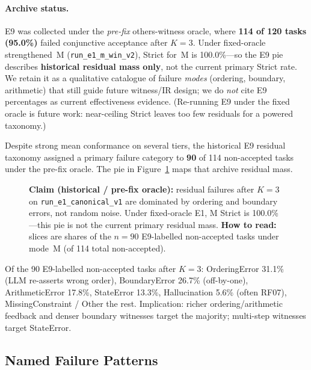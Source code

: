 \paragraph{Archive status.}
E9 was collected under the \emph{pre-fix} others-witness oracle, where
\textbf{114 of 120 tasks (95.0\%)} failed conjunctive acceptance after
$K{=}3$.
Under fixed-oracle strengthened~M (\texttt{run\_e1\_m\_win\_v2}), Strict for~M
is 100.0\%---so the E9 pie describes \textbf{historical residual mass only},
not the current primary Strict rate.
We retain it as a qualitative catalogue of failure \emph{modes} (ordering,
boundary, arithmetic) that still guide future witness/IR design; we do
\emph{not} cite E9 percentages as current effectiveness evidence.
(Re-running E9 under the fixed oracle is future work: near-ceiling Strict
leaves too few residuals for a powered taxonomy.)

Despite strong mean conformance on several tiers, the historical E9 residual
taxonomy assigned a primary failure category to \textbf{90} of 114
non-accepted tasks under the pre-fix oracle.
The pie in Figure~\ref{fig:failure-taxonomy} maps that archive residual mass.

\begin{figure}[t]
  \centering
  \caption{\textbf{Claim (historical / pre-fix oracle):} residual failures
    after $K=3$ on \texttt{run\_e1\_canonical\_v1} are dominated by ordering
    and boundary errors, not random noise.
    Under fixed-oracle E1, M Strict is 100.0\%---this pie is not the current
    primary residual mass.
    \textbf{How to read:} slices are shares of the $n{=}90$ E9-labelled
    non-accepted tasks under mode~M (of 114 total non-accepted).}
  \label{fig:failure-taxonomy}
\end{figure}

Of the 90 E9-labelled non-accepted tasks after $K{=}3$: OrderingError 31.1\% (LLM re-asserts
wrong order), BoundaryError 26.7\% (off-by-one), ArithmeticError 17.8\%,
StateError 13.3\%, Hallucination 5.6\% (often RF07), MissingConstraint /
Other the rest.
Implication: richer ordering/arithmetic feedback and denser boundary
witnesses target the majority; multi-step witnesses target StateError.

\subsection{Named Failure Patterns}
\label{sec:disc:failure-patterns}

